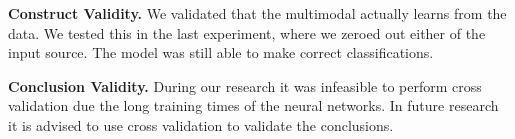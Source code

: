 \textbf{Construct Validity.} We validated that the multimodal actually learns from the data. We tested this in the last experiment, where we zeroed out either of the input source. The model was still able to make correct classifications.

\textbf{Conclusion Validity.} During our research it was infeasible to perform cross validation due the long training times of the neural networks. In future research it is advised to use cross validation to validate the conclusions.
